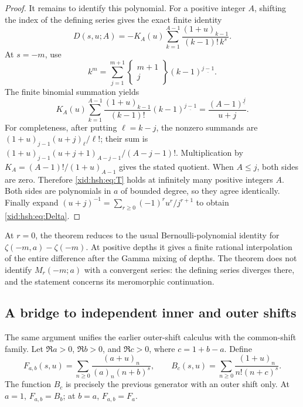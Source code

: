 \documentclass[11pt,a4paper]{article}
\numberwithin{equation}{section}
\theoremstyle{definition}
\theoremstyle{remark}
\begin{document}
\begin{proof}
It remains to identify this polynomial. For a positive integer $A$,
shifting the index of the defining series gives the exact finite
identity
\[
 D(s,u;A)=-K_A(u)\sum_{k=1}^{A-1}
           \frac{(1+u)_{k-1}}{(k-1)!\,k^s}.
\]
At $s=-m$, use
\[
 k^m=\sum_{j=1}^{m+1}
       {\left\{\begin{matrix}m+1\\j\end{matrix}\right\}}
         (k-1)^{\underline{j-1}}.
\]
The finite binomial summation yields
\[
 K_A(u)\sum_{k=1}^{A-1}
       \frac{(1+u)_{k-1}}{(k-1)!}
              (k-1)^{\underline{j-1}}
       =\frac{(A-1)^{\underline j}}{u+j}.
\]
For completeness, after putting $\ell=k-j$, the nonzero summands are
$(1+u)_{j-1}(u+j)_\ell/\ell!$; their sum is
$(1+u)_{j-1}(u+j+1)_{A-j-1}/(A-j-1)!$.
Multiplication by $K_A=(A-1)!/(1+u)_{A-1}$ gives the stated quotient.
When $A\le j$, both sides are zero. Therefore \eqref{xid:hsh:eq:T} holds
at infinitely many positive integers $A$. Both sides are polynomials
in $a$ of bounded degree, so they agree identically. Finally expand
$(u+j)^{-1}=\sum_{r\ge0}(-1)^ru^r/j^{r+1}$ to obtain
\eqref{xid:hsh:eq:Delta}.
\end{proof}

At $r=0$, the theorem reduces to the usual Bernoulli-polynomial
identity for $\zeta(-m,a)-\zeta(-m)$. At positive depths it gives a
finite rational interpolation of the entire difference after the
Gamma mixing of depths. The theorem does not identify
$M_r(-m;a)$ with a convergent series: the defining series diverges
there, and the statement concerns its meromorphic continuation.

\subsection{A bridge to independent inner and outer shifts}

The same argument unifies the earlier outer-shift calculus with the
common-shift family. Let $\Re a>0$, $\Re b>0$, and
$\Re c>0$, where $c=1+b-a$. Define
\[
 F_{a,b}(s,u)=\sum_{n\ge0}\frac{(a+u)_n}{(a)_n(n+b)^s},
 \qquad B_c(s,u)=\sum_{n\ge0}\frac{(1+u)_n}{n!(n+c)^s}.
\]
The function $B_c$ is precisely the previous generator with an outer
shift only. At $a=1$, $F_{a,b}=B_b$; at $b=a$, $F_{a,b}=F_a$.
\end{document}
